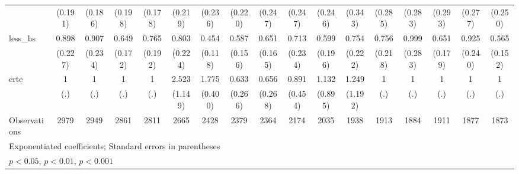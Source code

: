 {\begin{tabular}{l*{16}{c}}
                    &     (0.191)         &     (0.186)         &     (0.198)         &     (0.178)         &     (0.219)         &     (0.236)         &     (0.220)         &     (0.247)         &     (0.247)         &     (0.246)         &     (0.343)         &     (0.285)         &     (0.283)         &     (0.293)         &     (0.277)         &     (0.250)         \\
[1em]
less\_hs             &       0.898         &       0.907         &       0.649         &       0.765         &       0.803         &       0.454\sym{**} &       0.587\sym{*}  &       0.651         &       0.713         &       0.599         &       0.754         &       0.756         &       0.999         &       0.651         &       0.925         &       0.565\sym{*}  \\
                    &     (0.227)         &     (0.234)         &     (0.172)         &     (0.192)         &     (0.224)         &     (0.118)         &     (0.156)         &     (0.165)         &     (0.234)         &     (0.196)         &     (0.222)         &     (0.218)         &     (0.283)         &     (0.179)         &     (0.240)         &     (0.152)         \\
[1em]
erte                &           1         &           1         &           1         &           1         &       2.523\sym{*}  &       1.775\sym{*}  &       0.633         &       0.656         &       0.891         &       1.132         &       1.249         &           1         &           1         &           1         &           1         &           1         \\
                    &         (.)         &         (.)         &         (.)         &         (.)         &     (1.149)         &     (0.400)         &     (0.266)         &     (0.268)         &     (0.454)         &     (0.895)         &     (1.192)         &         (.)         &         (.)         &         (.)         &         (.)         &         (.)         \\
\hline
Observations        &        2979         &        2949         &        2861         &        2811         &        2665         &        2428         &        2379         &        2364         &        2174         &        2035         &        1938         &        1913         &        1884         &        1911         &        1877         &        1873         \\
\hline\hline
\multicolumn{17}{l}{\footnotesize Exponentiated coefficients; Standard errors in parentheses}\\
\multicolumn{17}{l}{\footnotesize \sym{*} \(p<0.05\), \sym{**} \(p<0.01\), \sym{***} \(p<0.001\)}\\
\end{tabular}
}
